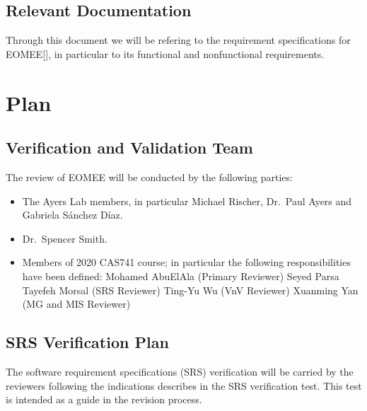 \documentclass[12pt, titlepage]{article}
\begin{document}
\subsection{Relevant Documentation}


Through this document we will be refering to the requirement specifications for 
EOMEE[\citet{SRS2020}], in particular to its functional and nonfunctional 
requirements.

\section{Plan}
	
\subsection{Verification and Validation Team}

The review of EOMEE will be conducted by the following parties:
\begin{itemize}
	\item The Ayers Lab members, in particular Michael Rischer, Dr.\ Paul Ayers 
	and Gabriela S\'anchez D\'iaz.
	\item Dr.\ Spencer Smith.
	\item Members of 2020 CAS741 course; in particular the following 
	responsibilities have been defined:
	\subitem Mohamed AbuElAla (Primary Reviewer)
	\subitem Seyed Parsa Tayefeh Morsal (SRS Reviewer)
	\subitem Ting-Yu Wu (VnV Reviewer)
	\subitem Xuanming Yan (MG and MIS Reviewer)
\end{itemize}

\subsection{SRS Verification Plan}

The software requirement specifications (SRS) verification will be carried by 
the reviewers following the indications describes in the SRS verification test. 
This test is intended as a guide in the revision process.
\end{document}
